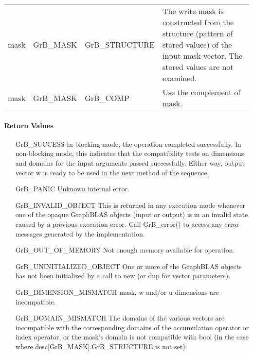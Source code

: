 \begin{itemize}[leftmargin=1.1in]
\begin{tabular}{lllp{2.7in}}
        {\sf mask} & {\sf GrB\_MASK} & {\sf GrB\_STRUCTURE}   & The write mask is
        constructed from the structure (pattern of stored values) of the input
        {\sf mask} vector. The stored values are not examined.\\

        {\sf mask} & {\sf GrB\_MASK} & {\sf GrB\_COMP}   & Use the 
        complement of {\sf mask}. \\
    \end{tabular}
\end{itemize}

\paragraph{Return Values}

\begin{itemize}[leftmargin=2.1in]
    \item[{\sf GrB\_SUCCESS}]         In blocking mode, the operation completed
    successfully. In non-blocking mode, this indicates that the compatibility 
    tests on dimensions and domains for the input arguments passed successfully. 
    Either way, output vector {\sf w} is ready to be used in the next method of 
    the sequence.

    \item[{\sf GrB\_PANIC}]           Unknown internal error.

    \item[{\sf GrB\_INVALID\_OBJECT}] This is returned in any execution mode 
    whenever one of the opaque GraphBLAS objects (input or output) is in an invalid 
    state caused by a previous execution error.  Call {\sf GrB\_error()} to access 
    any error messages generated by the implementation.

    \item[{\sf GrB\_OUT\_OF\_MEMORY}] Not enough memory available for operation.

    \item[{\sf GrB\_UNINITIALIZED\_OBJECT}] One or more of the GraphBLAS objects
    has not been initialized by a call to {\sf new} (or {\sf dup} for vector
    parameters).

    \item[{\sf GrB\_DIMENSION\_MISMATCH}]  {\sf mask}, {\sf w} and/or {\sf u}
    dimensions are incompatible.

    \item[{\sf GrB\_DOMAIN\_MISMATCH}]    The domains of the various vectors are
    incompatible with the corresponding domains of the accumulation operator
    or index operator, or the mask's domain is not compatible with {\sf bool}
    (in the case where {\sf desc[GrB\_MASK].GrB\_STRUCTURE} is not set).
\end{itemize}

